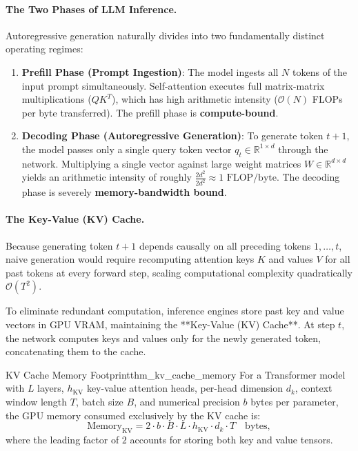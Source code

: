 \documentclass[../../../main.tex]{subfiles}
\begin{document}
\paragraph{The Two Phases of LLM Inference.}
Autoregressive generation naturally divides into two fundamentally distinct operating regimes:
\begin{enumerate}
    \item \textbf{Prefill Phase (Prompt Ingestion)}: The model ingests all $N$ tokens of the input prompt simultaneously. Self-attention executes full matrix-matrix multiplications ($Q K^T$), which has high arithmetic intensity ($\mathcal{O}(N)$ FLOPs per byte transferred). The prefill phase is \textbf{compute-bound}.
    \item \textbf{Decoding Phase (Autoregressive Generation)}: To generate token $t+1$, the model passes only a single query token vector $q_t \in \mathbb{R}^{1 \times d}$ through the network. Multiplying a single vector against large weight matrices $W \in \mathbb{R}^{d \times d}$ yields an arithmetic intensity of roughly $\frac{2 d^2}{2 d^2} \approx 1\text{ FLOP/byte}$. The decoding phase is severely \textbf{memory-bandwidth bound}.
\end{enumerate}

\paragraph{The Key-Value (KV) Cache.}
Because generating token $t+1$ depends causally on all preceding tokens $1, \dots, t$, naive generation would require recomputing attention keys $K$ and values $V$ for all past tokens at every forward step, scaling computational complexity quadratically $\mathcal{O}(T^2)$.

To eliminate redundant computation, inference engines store past key and value vectors in GPU VRAM, maintaining the **Key-Value (KV) Cache**. At step $t$, the network computes keys and values only for the newly generated token, concatenating them to the cache.

\begin{theorem}{KV Cache Memory Footprint}{thm_kv_cache_memory}
For a Transformer model with $L$ layers, $h_{\text{KV}}$ key-value attention heads, per-head dimension $d_k$, context window length $T$, batch size $B$, and numerical precision $b$ bytes per parameter, the GPU memory consumed exclusively by the KV cache is:
\begin{equation}
\label{eq:kv_cache_formula}
\text{Memory}_{\text{KV}} = 2 \cdot b \cdot B \cdot L \cdot h_{\text{KV}} \cdot d_k \cdot T \quad \text{bytes},
\end{equation}
where the leading factor of $2$ accounts for storing both key and value tensors.
\end{theorem}
\end{document}
